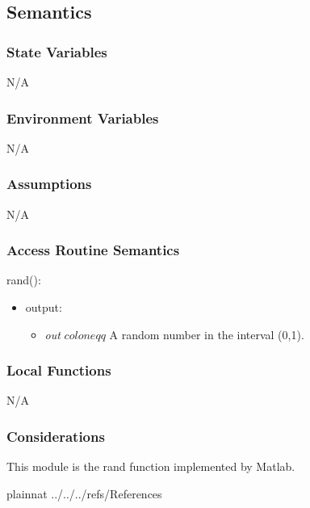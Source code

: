 \documentclass[12pt, titlepage]{article}
\begin{document}
\subsection{Semantics}

\subsubsection{State Variables}

N/A

\subsubsection{Environment Variables}

N/A

\subsubsection{Assumptions}

N/A

\subsubsection{Access Routine Semantics}

rand():
\begin{itemize}
	\item output: 
	\begin{itemize}
		\item[] \textit{out} $coloneqq$ A random number in the interval (0,1).
	\end{itemize}
\end{itemize}

\subsubsection{Local Functions}

N/A

\subsubsection{Considerations}
This module is the rand function implemented by Matlab.

\newpage

 {plainnat}
 {../../../refs/References}

\newpage

\end{document}
